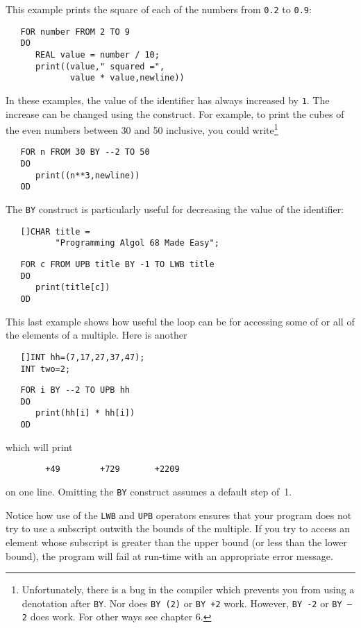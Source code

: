 This example prints the square of each of the numbers from \verb|0.2|
to \verb|0.9|:
\begin{verbatim}
   FOR number FROM 2 TO 9
   DO
      REAL value = number / 10;
      print((value," squared =",
             value * value,newline))
\end{verbatim}
\noindent
In these examples, the value of the identifier has always increased
by \verb|1|. The increase can be changed using the 
construct. For example, to print the cubes of the even numbers
between 30 and 50 inclusive, you could write\footnote{Unfortunately,
there is a bug in the \protect{}
compiler which prevents you from using a denotation after
\texttt{BY}. Nor does \texttt{BY (2)} or \texttt{BY +2} work.
However, \texttt{BY -2} or \texttt{BY --2} does work. For other ways see chapter 6.}
\begin{verbatim}
   FOR n FROM 30 BY --2 TO 50
   DO
      print((n**3,newline))
   OD
\end{verbatim}
\noindent
The \verb|BY| construct is particularly useful for decreasing the
value of the identifier:
\begin{verbatim}
   []CHAR title =
          "Programming Algol 68 Made Easy";
\end{verbatim}
\begin{verbatim}
   FOR c FROM UPB title BY -1 TO LWB title
   DO
      print(title[c])
   OD
\end{verbatim}
\noindent
This last example shows how useful the loop
 can be for accessing some of or all of
the elements of a multiple.  Here is another
\begin{verbatim}
   []INT hh=(7,17,27,37,47);
   INT two=2;
\end{verbatim}
\begin{verbatim}
   FOR i BY --2 TO UPB hh
   DO
      print(hh[i] * hh[i])
   OD
\end{verbatim}
\noindent
which will print
\begin{verbatim}
        +49        +729       +2209
\end{verbatim}
\noindent
on one line.  Omitting the \verb|BY| construct assumes a default step
of~1.

Notice how use of the \verb|LWB| and \verb|UPB| operators ensures
that your program does not try to use a subscript outwith the bounds
of the multiple. If you try to access an element whose subscript is
greater than the upper bound (or less than the lower bound), the
program will fail at run-time with an appropriate error message.

